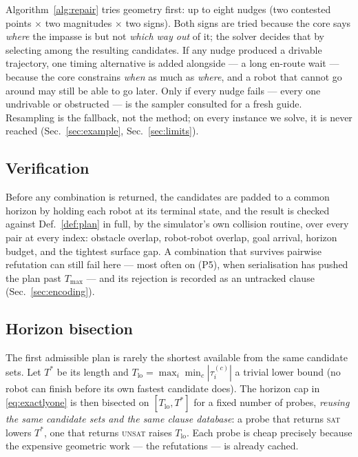 \documentclass[conference]{IEEEtran}
\begin{document}
Algorithm~\ref{alg:repair} tries geometry first: up to eight nudges (two contested points
$\times$ two magnitudes $\times$ two signs). Both signs are tried because the core says
\emph{where} the impasse is but not \emph{which way out} of it; the solver decides that by
selecting among the resulting candidates. If any nudge produced a drivable trajectory, one
timing alternative is added alongside --- a long en-route wait --- because the core
constrains \emph{when} as much as \emph{where}, and a robot that cannot go around may still
be able to go later. Only if every nudge fails --- every one undrivable or obstructed --- is
the sampler consulted for a fresh guide. Resampling is the fallback, not the method; on
every instance we solve, it is never reached (Sec.~\ref{sec:example},
Sec.~\ref{sec:limits}).

\subsection{Verification}
\label{sec:verify}

Before any combination is returned, the candidates are padded to a common horizon by
holding each robot at its terminal state, and the result is checked against
Def.~\ref{def:plan} in full, by the simulator's own collision routine, over every pair at
every index: obstacle overlap, robot-robot overlap, goal arrival, horizon budget, and the
tightest surface gap. A combination that survives pairwise refutation can still fail here
--- most often on (P5), when serialisation has pushed the plan past $T_{\max}$ --- and its
rejection is recorded as an untracked clause (Sec.~\ref{sec:encoding}).

\subsection{Horizon bisection}
\label{sec:bisect}

The first admissible plan is rarely the shortest available from the same candidate sets. Let
$T^\ast$ be its length and
$T_{\text{lo}} = \max_i \min_{c} |\tau_i^{(c)}|$ a trivial lower bound (no robot can finish
before its own fastest candidate does). The horizon cap in \eqref{eq:exactlyone} is then
bisected on $[T_{\text{lo}}, T^\ast]$ for a fixed number of probes, \emph{reusing the same
candidate sets and the same clause database}: a probe that returns \textsc{sat} lowers
$T^\ast$, one that returns \textsc{unsat} raises $T_{\text{lo}}$. Each probe is cheap
precisely because the expensive geometric work --- the refutations --- is already cached.
\end{document}
